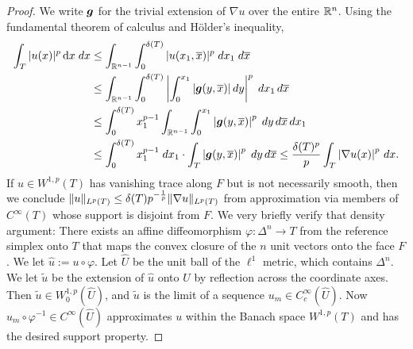 \documentclass[10pt,a4paper]{article}
\begin{document}
\begin{proof}
    We write $\bm{g}$ for the trivial extension of $\nabla u$ over the entire ${\mathbb R}^{n}$.
    Using the fundamental theorem of calculus and H\"older's inequality, 
    \begin{align*}
        \int_{T} |u(x)|^{p} \mathop{}\!\mathrm{d} x \;dx
        &\leq
        \int_{{\mathbb R}^{n-1}} \int_{0}^{{\delta}(T)} |u( x_{1}, \overline x )|^{p} \;dx_{1} \;d\overline{x}
        \\&
        \leq
        \int_{{\mathbb R}^{n-1}} \int_{0}^{{\delta}(T)} \left| \int_{0}^{x_{1}} |\bm{g}( y, \overline x )| \,dy \right|^{p} \;dx_{1} \,d\overline{x}
        \\&
        \leq
        \int_{0}^{{\delta}(T)} x_{1}^{p-1} \int_{{\mathbb R}^{n-1}} \int_{0}^{x_{1}} \left| \bm{g}( y, \overline x ) \right|^{p} \;dy \,d\overline{x} \,dx_{1}
        \\&
        \leq
        \int_{0}^{{\delta}(T)} x_{1}^{p-1} \;dx_1 
        \cdot 
        \int_{T} \left| \bm{g}( y, \overline x ) \right|^{p} \;dy \,d\overline{x} 
        \leq
        \frac{{\delta}(T)^{p}}{p} \int_{T} \left| \nabla u( x ) \right|^{p} \,dx
        .
    \end{align*}
    If $u \in W^{1,p}(T)$ has vanishing trace along $F$ but is not necessarily smooth, 
    then we conclude $\|u\|_{L^{p}(T)} \leq {\delta}(T) p^{-\frac 1 p} \|\nabla u\|_{L^{p}(T)}$ 
    from approximation via members of $C^{\infty}(T)$ whose support is disjoint from $F$. 
    We very briefly verify that density argument: 
    There exists an affine diffeomorphism $\varphi : \Delta^{n} \rightarrow T$ from the reference simplex onto $T$ that maps the convex closure of the $n$ unit vectors onto the face $F$.
    We let $\hat u := u \circ \varphi$.
    Let $\hat U$ be the unit ball of the $\ell^1$ metric, which contains $\Delta^{n}$.
    We let $\tilde u$ be the extension of $\hat u$ onto $\hat U$ by reflection across the coordinate axes.
    Then $\tilde u \in W^{1,p}_{0}(\hat U)$, and $\tilde u$ is the limit of a sequence $u_{m} \in C^{\infty}_{c}(\hat U)$.
    Now $u_{m} \circ \varphi^{-1} \in C^{\infty}(\hat U)$ approximates $u$ within the Banach space $W^{1,p}(T)$
    and has the desired support property. 
\end{proof}
\end{document}
